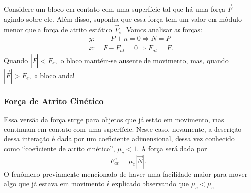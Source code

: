 \documentclass{article}
\begin{document}
   Considere um bloco em contato com uma superfície tal que há uma força $\vec{F}$ agindo sobre ele. Além disso,
   suponha que essa força tem um valor em módulo menor que a força de atrito estático $\vec{F}_{e}.$ Vamos analisar as forças:
  \begin{align*}
    &y:\quad -P + n = 0 \Rightarrow N = P\\
    &x:\quad F - F_{at} = 0 \Rightarrow F_{at} = F.
  \end{align*}
  Quando $|\vec{F}|<F_{e},$ o bloco mantém-se ausente de movimento, mas, quando $|\vec{F}| > F_{e},$ o bloco anda!
 \subsubsection{Força de Atrito Cinético}
 Essa versão da força surge para objetos que já estão em movimento, mas continuam em contato com uma superfície. Neste caso,
 novamente, a descrição dessa interação é dada por um coeficiente adimensional, dessa vez conhecido como ``coeficiente de atrito
 cinético'', $\mu_{c} < 1$. A força será dada por 
   $$
     F_{at}^{c} = \mu_{c}|\vec{N}|.
   $$
  O fenômeno previamente mencionado de haver uma facilidade maior para mover algo que já estava em movimento é explicado observando
  que $\mu_{c} < \mu_{e}!$
\end{document}
